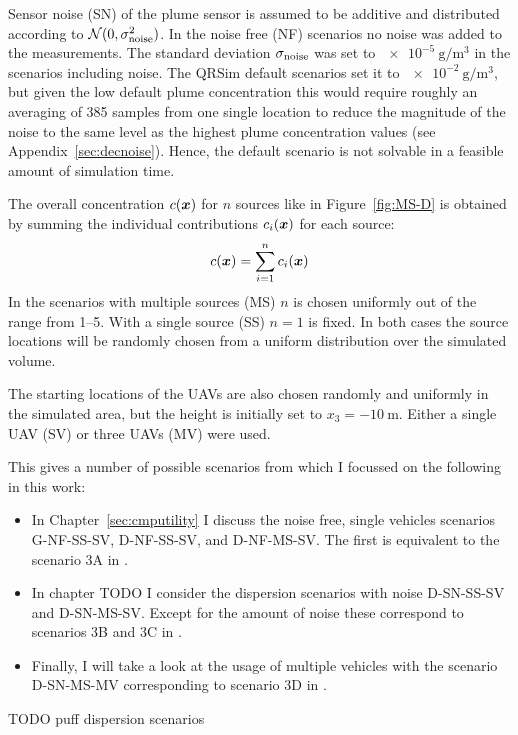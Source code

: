 Sensor noise (SN) of the plume sensor is assumed to be additive and distributed 
according to $\mathcal{N}(0, \sigma_{\mathrm{noise}}^2)$. In the noise free (NF) 
scenarios no noise was added to the measurements. The standard deviation 
$\sigma_{\mathrm{noise}}$ was set to $\SI{e-5}{\gram\per\meter\cubed}$ in the 
scenarios including noise.  The QRSim default scenarios set it to 
$\SI{e-2}{\gram\per\meter\cubed}$, but given the low default plume concentration 
this would require roughly an averaging of 385 samples from one single location 
to reduce the magnitude of the noise to the same level as the highest plume 
concentration values (see Appendix~\ref{sec:decnoise}).  Hence, the default 
scenario is not solvable in a feasible amount of simulation time.

The overall concentration $c(\bm{x})$ for $n$ sources like in 
Figure~\ref{fig:MS-D} is obtained by summing the individual contributions 
$c_i(\bm{x})$ for each source:
\begin{equation}
    c(\bm{x}) = \sum_{i = 1}^n c_i(\bm{x})
\end{equation}
In the scenarios with multiple sources (MS) $n$ is chosen uniformly out of the 
range from \numrange{1}{5}. With a single source (SS) $n = 1$ is fixed. In both 
cases the source locations will be randomly chosen from a uniform distribution 
over the simulated volume.

The starting locations of the UAVs are also chosen randomly and uniformly in the 
simulated area, but the height is initially set to $x_3 = \SI{-10}{\meter}$.  
Either a single UAV (SV) or three UAVs (MV) were used.

This gives a number of possible scenarios from which I focussed on the following 
in this work:
\begin{itemize}
    \item In Chapter~\ref{sec:cmputility} I discuss the noise free, single 
        vehicles scenarios G-NF-SS-SV, D-NF-SS-SV, and D-NF-MS-SV\@. The first 
        is equivalent to the scenario 3A in \textcite{denardi2013rn}.
    \item In chapter TODO I consider the dispersion scenarios with noise 
        D-SN-SS-SV and D-SN-MS-SV\@. Except for the amount of noise these 
        correspond to scenarios 3B and 3C in \textcite{denardi2013rn}.
    \item Finally, I will take a look at the usage of multiple vehicles with the 
        scenario D-SN-MS-MV corresponding to scenario 3D in 
        \textcite{denardi2013rn}.
\end{itemize}

TODO puff dispersion scenarios

